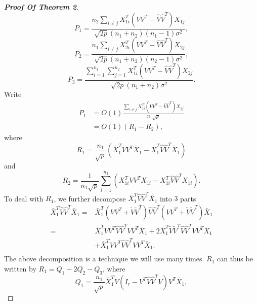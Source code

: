 \begin{proof}[\textbf{Proof Of Theorem 2}]
\begin{equation*}
        P_1=\frac{n_2\sum_{i\neq j}X_{1i}^T(VV^T-\hat{V}\hat{V}^T)X_{1j}}{\sqrt{2p}(n_1+n_2)(n_1-1)\sigma^2},
\end{equation*}
\begin{equation*}
        P_2=\frac{n_1\sum_{i\neq j}X_{2i}^T(VV^T-\hat{V}\hat{V}^T)X_{2j}}{\sqrt{2p}(n_1+n_2)(n_2-1)\sigma^2},
\end{equation*}
\begin{equation*}
        P_3=\frac{\sum_{i=1}^{n_1}\sum_{j=1}^{n_2}X_{1i}^T(VV^T-\hat{V}\hat{V}^T)X_{2j}}{\sqrt{2p}(n_1+n_2)\sigma^2}.
\end{equation*}
Write
\begin{equation*}
    \begin{aligned}
        P_1&=O(1)\frac{\sum_{i\neq j}X_{1i}^T(VV^T-\hat{V}\hat{V}^T)X_{1j}}{n_1\sqrt{p}}\\
        &=O(1)(R_1-R_2),
    \end{aligned}
\end{equation*}
where
\begin{equation*}
    R_1=\frac{n_1}{\sqrt{p}}(\bar{X}_1^T VV^T\bar{X}_1-\bar{X}_1^T \hat{V}\hat{V}^T\bar{X}_1)
\end{equation*}
and 
\begin{equation*}
    R_2=\frac{1}{n_1\sqrt{p}}\sum_{i=1}^{n_1}(X_{1i}^T VV^T X_{1i}-X_{1i}^T \hat{V}\hat{V}^T X_{1i}).
\end{equation*}
To deal with $R_1$, we further decompose $\bar{X}_1^T \hat{V}\hat{V}^T\bar{X}_1$  into $3$ parts
    \begin{equation*}
    \begin{aligned} 
        \bar{X}_1^T \hat{V}\hat{V}^T\bar{X}_1=&
        \bar{X}_1^T (VV^T+\tilde{V}\tilde{V}^T) \hat{V}\hat{V}^T (VV^T+\tilde{V}\tilde{V}^T)\bar{X}_1\\
        =&\bar{X}_1^T VV^T \hat{V}\hat{V}^T VV^T \bar{X}_1
        +2\bar{X}_1^T \tilde{V}\tilde{V}^T \hat{V}\hat{V}^T VV^T \bar{X}_1\\
        &+\bar{X}_1^T VV^T \hat{V}\hat{V}^T VV^T \bar{X}_1.\\
    \end{aligned}
    \end{equation*} 
    The above decomposition is a technique we will use many times. $R_1$ can thus be written by $R_1=Q_1-2Q_2-Q_3$, where
    \begin{equation*}
        Q_1=\frac{n_1}{\sqrt{p}}\bar{X}_1^T V(I_r-V^T\hat{V}\hat{V}^T V)V^T \bar{X}_1,
    \end{equation*}

\end{proof}
